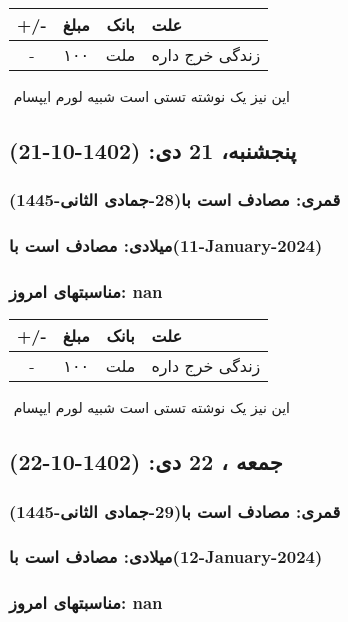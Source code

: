 \documentclass{article}
\newcommand{\rnote}[1]{\marginpar{\textcolor{color}{\StrSubstitute{\##1}{ }{\_}}}}
\newcommand{\myRow}[4]{
    #1 & #2 & #3 & #4 \\ \hline
}
\begin{document}
\begin{tabular}{ | c | c | c | p{5cm} |}
    \hline
    \myRow{ +/- }{مبلغ}{بانک}{علت}
    \myRow{-}{۱۰۰}{ملت}{زندگی خرج داره}
\end{tabular}
\newline
\newline

‌
\rnote{تست}
این نیز یک نوشته تستی است شبیه لورم ایپسام




\newpage
{}
\textcolor{color}{
\section{ پنجشنبه، 21 دی: (1402-10-21) }
\subsubsection*{قمری: مصادف است با(28-جمادی الثانی-1445)} 
\subsubsection*{میلادی: مصادف است با(11-January-2024)}
\subsubsection*{مناسبتهای امروز: nan}
}


\begin{tabular}{ | c | c | c | p{5cm} |}
    \hline
    \myRow{ +/- }{مبلغ}{بانک}{علت}
    \myRow{-}{۱۰۰}{ملت}{زندگی خرج داره}
\end{tabular}
\newline
\newline

‌
\rnote{تست}
این نیز یک نوشته تستی است شبیه لورم ایپسام




\newpage
{}
\textcolor{color}{
\section{ جمعه ، 22 دی: (1402-10-22) }
\subsubsection*{قمری: مصادف است با(29-جمادی الثانی-1445)} 
\subsubsection*{میلادی: مصادف است با(12-January-2024)}
\subsubsection*{مناسبتهای امروز: nan}
}
\end{document}
